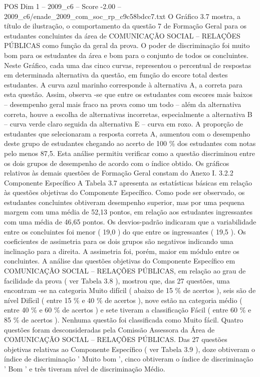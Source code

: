 \begin{textsample}{POS Dim 1 – 2009\_c6 – Score -2.00 – 2009\_c6/enade\_2009\_com\_soc\_rp\_c9c58bdcc7.txt}
O Gráfico 3.7 mostra, a título de ilustração, o comportamento da questão 7 de Formação Geral para os estudantes concluintes da área de COMUNICAÇÃO SOCIAL – RELAÇÕES PÚBLICAS como função da geral da prova.
O poder de discriminação foi muito bom para os estudantes da área e bom para o conjunto de todos os concluintes.
Neste Gráfico, cada uma das cinco curvas, representou o percentual de respostas em determinada alternativa da questão, em função do escore total destes estudantes.
A curva azul marinho corresponde à alternativa A, a correta para esta questão.
Assim, observa -se que entre os estudantes com escores mais baixos – desempenho geral mais fraco na prova como um todo – além da alternativa correta, houve a escolha de alternativas incorretas, especialmente a alternativa B – curva verde claro seguida da alternativa E – curva em roxo.
A proporção de estudantes que selecionaram a resposta correta A, aumentou com o desempenho deste grupo de estudantes chegando ao acerto de 100 \% dos estudantes com notas pelo menos 87,5.
Esta análise permitiu verificar como a questão discriminou entre os dois grupos de desempenho de acordo com o índice obtido.
Os gráficos relativos às demais questões de Formação Geral constam do Anexo I. 3.2.2 Componente Específico A Tabela 3.7 apresenta as estatísticas básicas em relação às questões objetivas do Componente Específico.
Como pode ser observado, os estudantes concluintes obtiveram desempenho superior, mas por uma pequena margem com uma média de 52,13 pontos, em relação aos estudantes ingressantes com uma média de 46,65 pontos.
Os desvios-padrão indicaram que a variabilidade entre os concluintes foi menor ( 19,0 ) do que entre os ingressantes ( 19,5 ).
Os coeficientes de assimetria para os dois grupos são negativos indicando uma inclinação para a direita.
A assimetria foi, porém, maior em módulo entre os concluintes.
A análise das questões objetivas do Componente Específico em COMUNICAÇÃO SOCIAL – RELAÇÕES PÚBLICAS, em relação ao grau de facilidade da prova ( ver Tabela 3.8 ), mostrou que, das 27 questões, uma encontram -se na categoria Muito difícil ( abaixo de 15 \% de acertos ), seis são de nível Difícil ( entre 15 \% e 40 \% de acertos ), nove estão na categoria médio ( entre 40 \% e 60 \% de acertos ) e sete tiveram a classificação Fácil ( entre 60 \% e 85 \% de acertos ).
Nenhuma questão foi classificada como Muito fácil.
Quatro questões foram desconsideradas pela Comissão Assessora da Área de COMUNICAÇÃO SOCIAL – RELAÇÕES PÚBLICAS.
Das 27 questões objetivas relativas ao Componente Específico ( ver Tabela 3.9 ), doze obtiveram o índice de discriminação ' Muito bom ', cinco obtiveram o índice de discriminação ' Bom ' e três tiveram nível de discriminação Médio.

\end{textsample}
